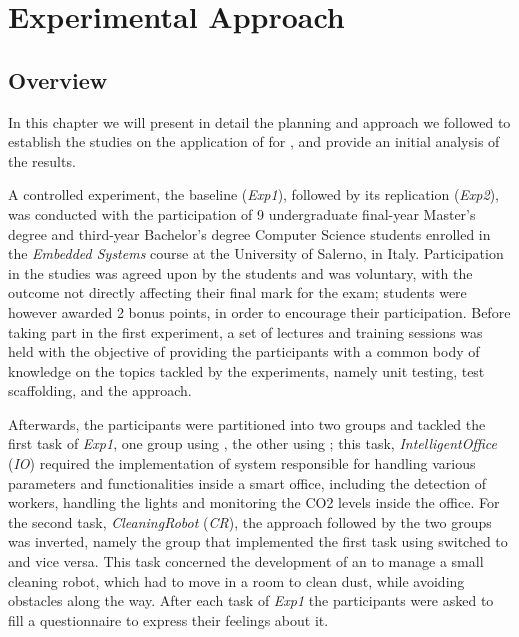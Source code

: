 \chapter{Experimental Approach}
\label{chap:5_approach}
\section{Overview}
In this chapter we will present in detail the planning and approach we followed to establish the studies on the application of \tdd for \ess, and provide an initial analysis of the results.

A controlled experiment, the baseline (\textit{Exp1}), followed by its replication (\textit{Exp2}), was conducted with the participation of 9 undergraduate final-year Master's degree and third-year Bachelor's degree Computer Science students enrolled in the \textit{Embedded Systems} course at the University of Salerno, in Italy. Participation in the studies was agreed upon by the students and was voluntary, with the outcome not directly affecting their final mark for the exam; students were however awarded 2 bonus points, in order to encourage their participation.
Before taking part in the first experiment, a set of lectures and training sessions was held with the objective of providing the participants with a common body of knowledge on the topics tackled by the experiments, namely unit testing, test scaffolding, and the \tdd approach.

Afterwards, the participants were partitioned into two groups and tackled the first task of \textit{Exp1}, one group using \tdd, the other using \notdd; this task, \textit{IntelligentOffice} (\textit{IO}) required the implementation of system responsible for handling various parameters and functionalities inside a smart office, including the detection of workers, handling the lights and monitoring the CO2 levels inside the office.
For the second task, \textit{CleaningRobot} (\textit{CR}), the approach followed by the two groups was inverted, namely the group that implemented the first task using \tdd switched to \notdd and vice versa. This task concerned the development of an \es to manage a small cleaning robot, which had to move in a room to clean dust, while avoiding obstacles along the way.
After each task of \textit{Exp1} the participants were asked to fill a questionnaire to express their feelings about it.

